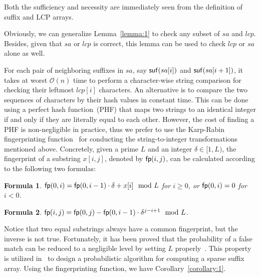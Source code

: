 \documentclass[10pt,journal,compsoc]{IEEEtran}
\newtheorem{Formula}{Formula}
\begin{document}
	\begin{IEEEproof}
		Both the sufficiency and necessity are immediately seen from the definition of suffix and LCP arrays.
	\end{IEEEproof}
	
	Obviously, we can generalize Lemma~\ref{lemma:1} to check any subset of $sa$ and $lcp$. Besides, given that $sa$ or $lcp$ is correct, this lemma can be used to check $lcp$ or $sa$ alone as well.
	
	For each pair of neighboring suffixes in $sa$, say ${\sf suf}(sa[i])$ and ${\sf suf}(sa[i + 1])$, it takes at worst $\mathcal{O}(n)$ time to perform a character-wise string comparison for checking their leftmost $lcp[i]$ characters. An alternative is to compare the two sequences of characters by their hash values in constant time. This can be done using a perfect hash function~(PHF) that maps two strings to an identical integer if and only if they are literally equal to each other. However, the cost of finding a PHF is non-negligible in practice, thus we prefer to use the Karp-Rabin fingerprinting function~\cite{Karp1987} for conducting the string-to-integer transformations mentioned above. Concretely, given a prime $L$ and an integer $\delta \in [1, L)$, the fingerprint of a substring $x[i, j]$, denoted by ${\sf fp}(i, j)$, can be calculated according to the following two formulas:
	
	\begin{Formula} \label{formula:1}
		${\sf fp}(0, i) = {\sf fp}(0, i - 1) \cdot {\delta} + x[i]\mod L$ for $i \ge 0$, or ${\sf fp}(0, i) = 0$ for $i < 0$.
		
	\end{Formula}
	
	\begin{Formula} \label{formula:2}
		${\sf fp}(i, j) = {\sf fp}(0, j) - {\sf fp}(0 ,i - 1) \cdot {\delta}^{j - i + 1}\mod L$.
		
	\end{Formula}
	
	Notice that two equal substrings always have a common fingerprint, but the inverse is not true. Fortunately, it has been proved that the probability of a false match can be reduced to a negligible level by setting $L$ properly~\cite{Karp1987}. This property is utilized in~\cite{Bille2013} to design a probabilistic algorithm for computing a sparse suffix array. Using the fingerprinting function, we have Corollary~\ref{corollary:1}.
	
\end{document}
